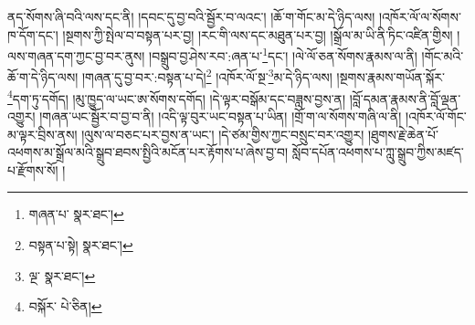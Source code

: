 ནད་སོགས་ཞི་བའི་ལས་དང་ནི། །དབང་དུ་བྱ་བའི་སྦྱོར་བ་ལའང་། །ཆོ་ག་གོང་མ་དེ་ཉིད་ལས། །འཁོར་ལོ་ལ་སོགས་ཁ་དོག་དང་། །སྔགས་ཀྱི་སྤེལ་བ་བསྟན་པར་བྱ། །རང་གི་ལས་དང་མཐུན་པར་བྱ། །སྒྲོལ་མ་ཡི་ནི་ཏིང་འཛིན་གྱིས། །ལས་གཞན་དག་ཀྱང་བྱ་བར་ནུས། །བསྒྲུབ་བྱ་ཤེས་རབ་:ཞན་པ་\footnote{གཞན་པ་  སྣར་ཐང་། }དང་། །ལེ་ལོ་ཅན་སོགས་རྣམས་ལ་ནི། །གོང་མའི་ཆོ་ག་དེ་ཉིད་ལས། །གཞན་དུ་བྱ་བར་:བསྟན་པ་དེ།\footnote{བསྟན་པ་སྟེ།  སྣར་ཐང་། } །འཁོར་ལོ་སྔ་\footnote{ལྔ་  སྣར་ཐང་། }མ་དེ་ཉིད་ལས། །སྔགས་རྣམས་གཡོན་སྐོར་\footnote{བསྐོར་  པེ་ཅིན། }དག་ཏུ་དགོད། །མུ་ཁྱུད་ལ་ཡང་ཨ་སོགས་དགོད། །དེ་ལྟར་བསྒོམ་དང་བཟླས་བྱས་ན། །བློ་དམན་རྣམས་ནི་བློ་ལྡན་འགྱུར། །གཞན་ཡང་སྦྱོར་བ་བྱ་བ་ནི། །འདི་ལྟ་བུར་ཡང་བསྟན་པ་ཡིན། །གྲོ་ག་ལ་སོགས་གཞི་ལ་ནི། །འཁོར་ལོ་གོང་མ་ལྟར་བྲིས་ནས། །ལུས་ལ་བཅང་པར་བྱས་ན་ཡང་། །དེ་ཙམ་གྱིས་ཀྱང་བསྲུང་བར་འགྱུར། །ཐུགས་རྗེ་ཆེན་པོ་འཕགས་མ་སྒྲོལ་མའི་སྒྲུབ་ཐབས་སྤྱིའི་མངོན་པར་རྟོགས་པ་ཞེས་བྱ་བ། སློབ་དཔོན་འཕགས་པ་ཀླུ་སྒྲུབ་ཀྱིས་མཛད་པ་རྫོགས་སོ། ། 